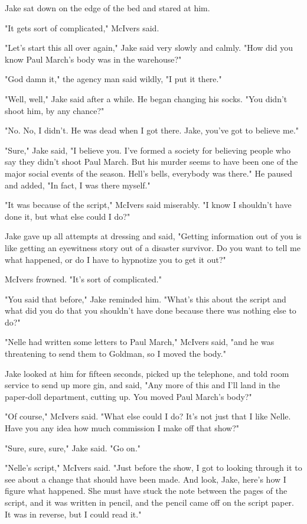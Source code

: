 \documentclass{novel}
\begin{document}
Jake sat down on the edge of the bed and stared at him.

"It gets sort of complicated," McIvers said.

"Let's start this all over again," Jake said very slowly and calmly. "How did you know Paul March's body was in the warehouse?"

"God damn it," the agency man said wildly, "I put it there."

"Well, well," Jake said after a while. He began changing his socks. "You didn't shoot him, by any chance?"

"No. No, I didn't. He was dead when I got there. Jake, you've got to believe me."

"Sure," Jake said, "I believe you. I've formed a society for believing people who say they didn't shoot Paul March. But his murder seems to have been one of the major social events of the season. Hell's bells, everybody was there." He paused and added, "In fact, I was there myself."

"It was because of the script," McIvers said miserably. "I know I shouldn't have done it, but what else could I do?"

Jake gave up all attempts at dressing and said, "Getting information out of you is like getting an eyewitness story out of a disaster survivor. Do you want to tell me what happened, or do I have to hypnotize you to get it out?"

McIvers frowned. "It's sort of complicated."

"You said that before," Jake reminded him. "What's this about the script and what did you do that you shouldn't have done because there was nothing else to do?"

"Nelle had written some letters to Paul March," McIvers said, "and he was threatening to send them to Goldman, so I moved the body."

Jake looked at him for fifteen seconds, picked up the telephone, and told room service to send up more gin, and said, "Any more of this and I'll land in the paper-doll department, cutting up. You moved Paul March's body?"

"Of course," McIvers said. "What else could I do? It's not just that I like Nelle. Have you any idea how much commission I make off that show?"

"Sure, sure, sure," Jake said. "Go on."

"Nelle's script," McIvers said. "Just before the show, I got to looking through it to see about a change that should have been made. And look, Jake, here's how I figure what happened. She must have stuck the note between the pages of the script, and it was written in pencil, and the pencil came off on the script paper. It was in reverse, but I could read it."
\end{document}
